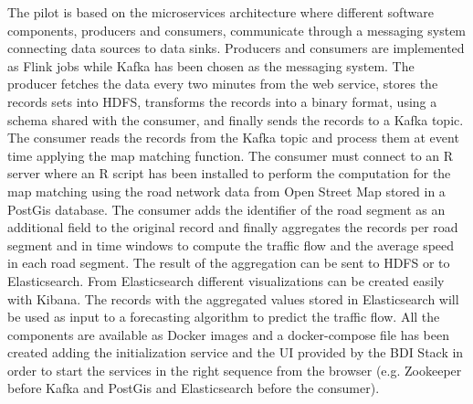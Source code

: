 The pilot is based on the microservices architecture where different software components, producers and consumers, communicate through a messaging system connecting data sources to data sinks.
Producers and consumers are implemented as Flink jobs while Kafka has been chosen as the messaging system.
The producer fetches the data every two minutes from the web service, stores the records sets into \gls{HDFS}, transforms the records into a binary format, using a schema shared with the consumer, and finally sends the records to a Kafka topic. 
The consumer reads the records from the Kafka topic and process them at event time applying the map matching function. 
The consumer must connect to an R server where an R script has been installed to perform the computation for the map matching using the road network data from Open Street Map stored in a PostGis database. 
The consumer adds the identifier of the road segment as an additional field to the original record and finally aggregates the records per road segment and in time windows to compute the traffic flow and the average speed in each road segment. 
The result of the aggregation can be sent to \gls{HDFS} or to Elasticsearch. 
From Elasticsearch different visualizations can be created easily with Kibana. 
The records with the aggregated values stored in Elasticsearch will be used as input to a forecasting algorithm to predict the traffic flow.
All the components are available as Docker images and a docker-compose file has been created adding the initialization service and the UI provided by the BDI Stack in order to start the services in the right sequence from the browser (e.g. Zookeeper before Kafka and PostGis and Elasticsearch before the consumer).

